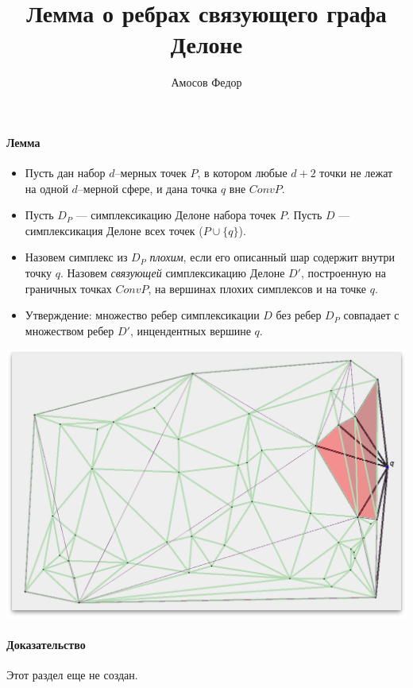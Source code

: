 \documentclass{article}
\title{\bf Лемма о ребрах связующего графа Делоне}
\author{Амосов Федор}
\begin{document}
	\maketitle

    \paragraph{Лемма\\}
        \begin{itemize}
            \item Пусть дан набор $d$--мерных точек $P$, в котором любые $d + 2$ точки не лежат на одной $d$--мерной сфере, и дана точка $q$ вне $Conv P$.
            \item Пусть $D_P$ --- симплексикацию Делоне набора точек $P$. Пусть $D$ --- симплексикация Делоне всех точек ($P \cup \{q\}$).
            \item Назовем симплекс из $D_P$ {\it плохим}, если его описанный шар содержит внутри точку $q$. Назовем {\it связующей} симплексикацию Делоне $D'$, построенную на граничных точках $Conv P$, на вершинах плохих симплексов и на точке $q$. 
            \item Утверждение: множество ребер симплексикации $D$ без ребер $D_P$ совпадает с множеством ребер $D'$, инцендентных вершине $q$.
        \end{itemize}
        
        \begin{center}
	        \includegraphics[scale = 0.45]{1.png}
	    \end{center}
        
    \paragraph{Доказательство\\}
        Этот раздел еще не создан.
        
        
        
\end{document}
